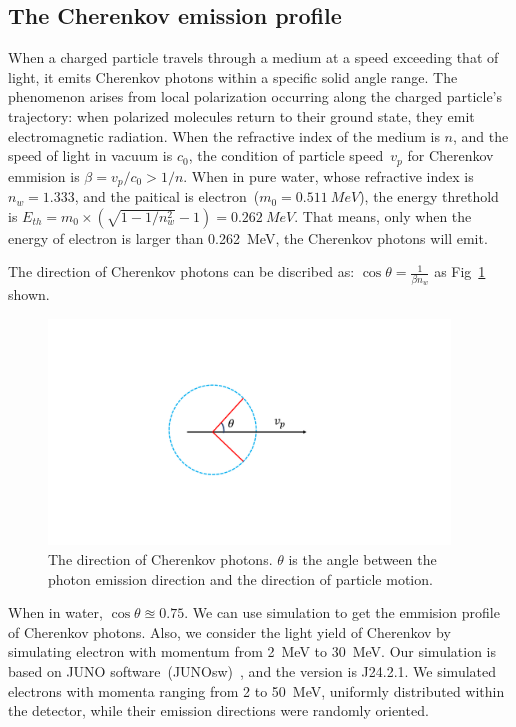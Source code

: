 \subsection{The Cherenkov emission profile}
When a charged particle travels through a medium at a speed exceeding that of light, it emits Cherenkov photons within a specific solid angle range. The phenomenon arises from local polarization occurring along the charged particle's trajectory: when polarized molecules return to their ground state, they emit electromagnetic radiation. When the refractive index of the medium is $n$, and the speed of light in vacuum is $c_0$, the condition of particle speed~$v_p$ for Cherenkov emmision is $\beta=v_p/c_0>1/n$. When in pure water, whose refractive index is $n_w=1.333$, and the paitical is electron~($m_0=\SI{0.511}{MeV}$), the energy threthold is $E_{th}=m_0\times(\sqrt{1-1/n_w^2}-1)=\SI{0.262}{MeV}$. That means, only when the energy of electron is larger than \SI{0.262}{MeV}, the Cherenkov photons will emit.

The direction of Cherenkov photons can be discribed as: $\cos\theta=\frac{1}{\beta n_w}$ as Fig~\ref{Fig:Cherenkov_emmision} shown.

\begin{figure}
	\begin{center}
		\includegraphics[height=6cm]{reconstruction/cherenkov_emission.pdf}
	\end{center}
	\caption{The direction of Cherenkov photons. $\theta$ is the angle between the photon emission direction and the direction of particle motion.}
	\label{Fig:Cherenkov_emmision}
\end{figure}

When in water, $\cos\theta\approxeq0.75$. We can use simulation to get the emmision profile of Cherenkov photons. Also, we consider the light yield of Cherenkov by simulating electron with momentum from \SI{2}{MeV} to \SI{30}{MeV}. Our simulation is based on JUNO software~(JUNOsw)~\cite{junosw}, and the version is J24.2.1. We simulated electrons with momenta ranging from 2 to \SI{50}{MeV}, uniformly distributed within the detector, while their emission directions were randomly oriented.

